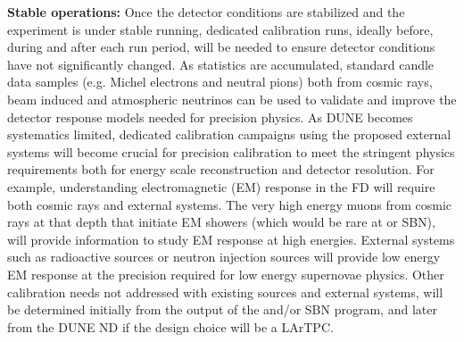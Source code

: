 \textbf{Stable operations:} Once the detector conditions are stabilized and the experiment is under stable running, dedicated calibration runs, ideally before, during and after each run period, will be needed to ensure detector conditions have not significantly changed. As statistics are accumulated, standard candle data samples (e.g. Michel electrons and neutral pions) both from cosmic rays, beam induced and atmospheric neutrinos can be used to validate and improve the detector response models needed for precision physics.  As DUNE becomes systematics limited, dedicated calibration campaigns using the proposed external systems will become crucial for precision calibration to meet the stringent physics requirements both for energy scale reconstruction and detector resolution. For example, understanding electromagnetic (EM) response in the FD will require both cosmic rays and external systems. The very high energy muons from cosmic rays at that depth that initiate EM showers (which would be rare at  or SBN), will provide information to study EM response at high energies. External systems such as radioactive sources or neutron injection sources will provide low energy EM response at the precision required for low energy supernovae physics. Other calibration needs not addressed with existing sources and external systems, will be determined initially from the output of the  and\slash or SBN program, and later from the DUNE ND if the design choice will be a LArTPC. 



